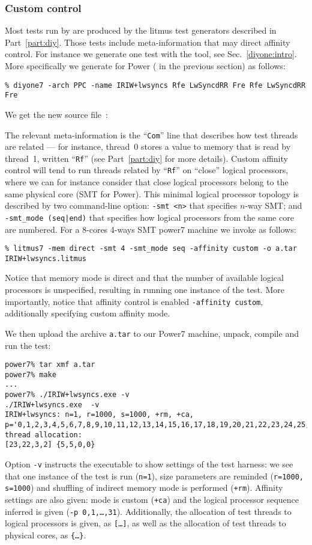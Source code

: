 \subsubsection{Custom\label{affinity:custom} control}
Most tests run by \litmus{} are produced by the litmus test generators
described in Part~\ref{part:diy}.
Those tests include meta-information that may direct affinity control.
For instance we generate one test with the
\diyone{} tool, see Sec.~\ref{diyone:intro}.
More specifically we generate
 for Power
( in the previous
section) as follows:
\begin{verbatim}
% diyone7 -arch PPC -name IRIW+lwsyncs Rfe LwSyncdRR Fre Rfe LwSyncdRR Fre
\end{verbatim}
We get the new source file~:

The relevant meta-information  is the ``\texttt{Com}'' line that describes
how test threads are related --- for instance, thread~0 stores a value
to memory that is read by thread~1, written ``\texttt{Rf}'' (see Part~\ref{part:diy} for more details).
Custom affinity control will tend to run threads related by ``\texttt{Rf}''
on ``close'' logical processors, where we can for instance consider
that close logical processors belong to the same physical core (SMT for Power).
This minimal logical processor topology is described by two \litmus{}
command-line option: \texttt{-smt <n>} that specifies $n$-way SMT;
and \texttt{-smt\_mode (seq|end)} that specifies how logical processors
from the same core are numbered.
For a 8-cores 4-ways SMT power7 machine we invoke \litmus{} as follows:
\begin{verbatim}
% litmus7 -mem direct -smt 4 -smt_mode seq -affinity custom -o a.tar IRIW+lwsyncs.litmus
\end{verbatim}
Notice that memory mode is direct and that the number of available
logical processors is unspecified, resulting in running one instance of
the test. More importantly, notice that affinity control is enabled
\texttt{-affinity custom}, additionally specifying custom affinity mode.

We then upload the archive \texttt{a.tar} to our Power7 machine,
unpack, compile and run the test:
\begin{verbatim}
power7% tar xmf a.tar
power7% make
...
power7% ./IRIW+lwsyncs.exe -v
./IRIW+lwsyncs.exe  -v
IRIW+lwsyncs: n=1, r=1000, s=1000, +rm, +ca, p='0,1,2,3,4,5,6,7,8,9,10,11,12,13,14,15,16,17,18,19,20,21,22,23,24,25,26,27,28,29,30,31'
thread allocation:
[23,22,3,2] {5,5,0,0}
\end{verbatim}
Option \texttt{-v} instructs the executable to show settings of the test harness: we see that one instance of the test is run (\texttt{n=1}),
size parameters are reminded (\texttt{r=1000, s=1000}) and
shuffling of indirect memory mode is performed (\texttt{+rm}).
Affinity settings are also given: mode is custom (\texttt{+ca}) and
the logical processor sequence inferred is given (\texttt{-p 0,1,\ldots,31}).
Additionally, the allocation  of test threads to logical processors is
given, as \texttt{[\ldots]}, as well as the allocation  of test threads
to physical cores, as \texttt{\{\ldots\}}.

